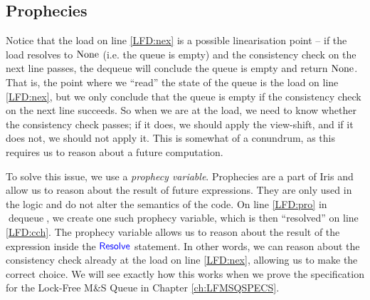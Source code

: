 \documentclass[a4paper, 10pt]{report}
\theoremstyle{definition}
\newcommand{\dequeue}{\operatorname{dequeue}}
\newcommand{\msq}{M\&S Queue}
\newcommand{\lfmsq}{Lock-Free \msq{}}
\begin{document}
\subsection{Prophecies}
Notice that the load on line \ref{LFD:nex} is a possible linearisation point -- if the load resolves to $\operatorname{None}$ (i.e. the queue is empty) and the consistency check on the next line passes, the dequeue will conclude the queue is empty and return $\operatorname{None}$. That is, the point where we ``read'' the state of the queue is the load on line \ref{LFD:nex}, but we only conclude that the queue is empty if the consistency check on the next line succeeds. So when we are at the load, we need to know whether the consistency check passes; if it does, we should apply the view-shift, and if it does not, we should not apply it. This is somewhat of a conundrum, as this requires us to reason about a future computation.

To solve this issue, we use a \textit{prophecy variable}. Prophecies are a part of Iris \citep{DBLP:journals/pacmpl/JungLPRTDJ20} and allow us to reason about the result of future expressions. They are only used in the logic and do not alter the semantics of the code. On line \ref{LFD:pro} in $\dequeue$, we create one such prophecy variable, which is then ``resolved'' on line \ref{LFD:cch}. The prophecy variable allows us to reason about the result of the expression inside the $\textsf{\color{blue} Resolve}$ statement. In other words, we can reason about the consistency check already at the load on line \ref{LFD:nex}, allowing us to make the correct choice. We will see exactly how this works when we prove the specification for the \lfmsq{} in Chapter \ref{ch:LFMSQSPECS}.
\end{document}
